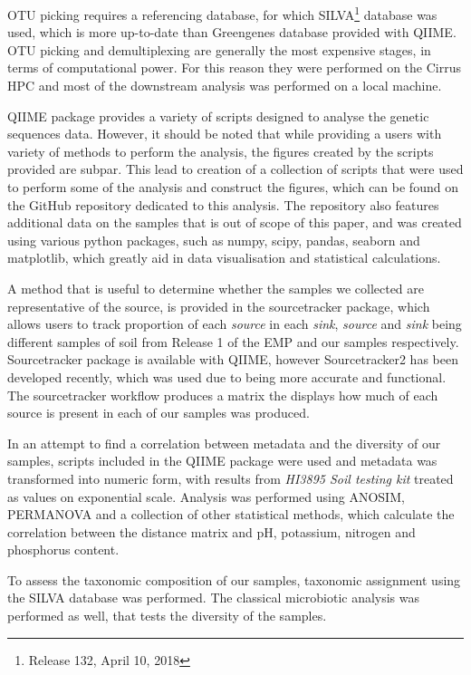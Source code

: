 \documentclass[12pt,twocolumn]{article} %
\begin{document}
\par 
OTU picking requires a referencing database, for which SILVA\footnote{Release 132, April 10, 2018}\cite{Quast2012} database was used, which is more up-to-date than Greengenes\cite{McDonald2012} database provided with QIIME. OTU picking and demultiplexing are generally the most expensive stages, in terms of computational power. For this reason they were performed on the Cirrus HPC and most of the downstream analysis was performed on a local machine. 
\par
QIIME package provides a variety of scripts designed to analyse the genetic sequences data. However, it should be noted that while providing a users with variety of methods to perform the analysis, the figures created by the scripts provided are subpar. This lead to creation of a collection of scripts that were used to perform some of the analysis and construct the figures, which can be found on the GitHub repository dedicated to this analysis\cite{Anonymous2018}. The repository also features additional data on the samples that is out of scope of this paper, and was created using various python packages, such as numpy, scipy, pandas, seaborn and matplotlib, which greatly aid in data visualisation and statistical calculations.
\par
A method that is useful to determine whether the samples we collected are representative of the source, is provided in the sourcetracker package\cite{Knights2011}, which allows users to track proportion of each \textit{source} in each \textit{sink}, \textit{source} and \textit{sink} being different samples of soil from Release 1 of the EMP and our samples respectively. Sourcetracker package is available with QIIME, however Sourcetracker2 has been developed recently, which was used due to being more accurate and functional. 
The sourcetracker workflow produces a matrix the displays how much of each source is present in each of our samples was produced.
\par
In an attempt to find a correlation between metadata and the diversity of our samples, scripts included in the QIIME package were used and metadata was transformed into numeric form, with results from \textit{HI3895 Soil testing kit} treated as values on exponential scale. Analysis was performed using ANOSIM\cite{CLARKE1993}, PERMANOVA\cite{Tang2016} and a collection of other statistical methods, which calculate the correlation between the distance matrix and pH, potassium, nitrogen and phosphorus content.
\par
To assess the taxonomic composition of our samples, taxonomic assignment using the SILVA\cite{Quast2012} database was performed. The classical microbiotic analysis was performed as well, that tests the diversity of the samples.
%
%
\end{document}
